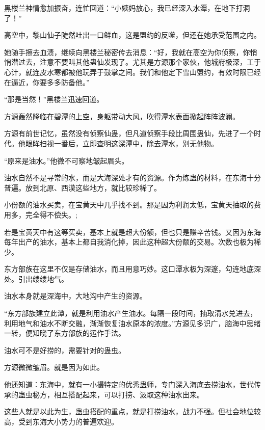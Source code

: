 
\begin{this_body}



黑楼兰神情愈加振奋，连忙回道：“小姨妈放心，我已经深入水潭，在地下打洞了！”

高空中，黎山仙子陡然吐出一口鲜血，这是盟约的反噬，但还在她承受范围之内。

她随手擦去血渍，继续向黑楼兰秘密传去消息：“好，我就在高空为你侦察，你悄悄潜过去，注意不要叫其他蛊仙发现了。尤其是方源那个家伙，他城府极深，工于心计，就连皮水寒都被他玩弄于鼓掌之间。我们和他定下雪山盟约，有效时限已经在逼近，你要多多防备他。”

“那是当然！”黑楼兰迅速回道。

方源轰然降临在碧潭的上空，身躯带动大风，吹得潭水表面掀起阵阵波澜。

方源有前世记忆，虽然没有侦察仙蛊，但凡道侦察手段比周围蛊仙，先进了一个时代。他眼眸扫视一番后，立即查明这深潭中，除去潭水，别无他物。

“原来是油水。”他微不可察地皱起眉头。

油水自然不是寻常的水，而是大海深处才有的资源。作为炼蛊的材料，在东海十分普遍。放到北原、西漠这些地方，就比较珍稀了。

小份额的油水买卖，在宝黄天中几乎找不到。那是因为利润太低，宝黄天抽取的费用多，完全得不偿失。;

若是宝黄天中有这等买卖，基本上就是超大份额，但也只是赚辛苦钱。又因为东海每年出产的油水，基本上都自我消化掉，因此这种超大份额的交易。次数也极为稀少。

东方部族在这里不仅是存储油水，而且用意巧妙。这口潭水极为深邃，勾连地底深处。引出缕缕地气。

油水本身就是深海中，大地沟中产生的资源。

“东方部族建立此潭，就是利用油水产生油水。每隔一段时间，抽取清水兑进去，利用地气和油水不断交融，渐渐恢复油水原本的浓度。”方源见多识广，脑海中思绪一转，便知晓了东方部族的运作手法。

油水可不是好捞的，需要针对的蛊虫。

方源微微皱眉。就是因为如此。

他还知道：东海中，就有一小撮特定的优秀蛊师，专门深入海底去捞油水，世代传承的蛊虫秘方，相互搭配起来，可以打捞、汲取这种油水出来。

这些人就是以此为生，蛊虫搭配的重点，就是打捞油水，战力不强。但社会地位较高，受到东海大小势力的普遍欢迎。


\end{this_body}
